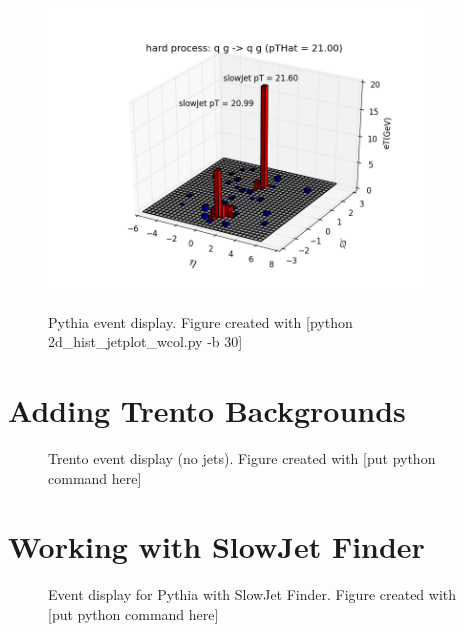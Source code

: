 \documentclass[11pt]{article}
\begin{document}
\begin{figure}[h]
\begin{center}
\includegraphics[width=0.9\textwidth]{2d_hist_jetplot_wcol.png}
\label{fig_label}
\caption{Pythia event display.  Figure created with [python 2d_hist_jetplot_wcol.py -b 30]}
\end{center}
\end{figure}

\section{Adding Trento Backgrounds}
%
%

\begin{figure}[h]
\begin{center}
\label{fig_label}
\caption{Trento event display (no jets).  Figure created with [put python command here]}
\end{center}
\end{figure}

\section{Working with SlowJet Finder}
%
%

\begin{figure}[h]
\begin{center}
\label{fig_label}
\caption{Event display for Pythia with SlowJet Finder.  Figure created with [put python command here]}
\end{center}
\end{figure}
\end{document}
